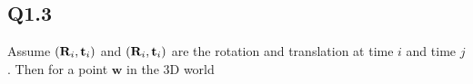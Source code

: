 \documentclass[11pt]{article}
\begin{document}
%
%
%

\newpage

\subsection*{Q1.3}

\newcommand{\pointw}{\mathbf{w}}

Assume $(\mathbf{R}_i, \mathbf{t}_i)$ and $(\mathbf{R}_i, \mathbf{t}_i)$ are the rotation and translation at time $i$ and time $j$. Then for a point $\pointw$ in the 3D world
\end{document}
